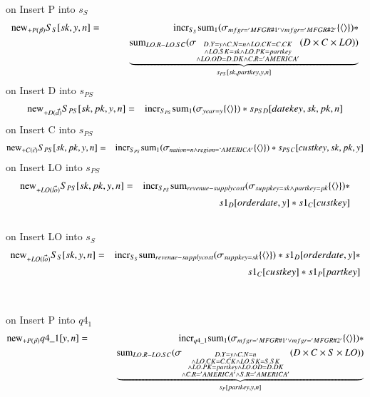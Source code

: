 on Insert P into $s_S$
\begin{eqnarray}
\mathrm{new}_{+P(\vec{p})} S_{S} [sk, y, n] &=& \mathrm{incr}_{S_{S}}
\mathrm{sum}_{1} (\sigma_{mfgr = 'MFGR\#1' \vee mfgr = 'MFGR\#2'} \{{\langle\rangle}\}) * 
\\\nonumber&&\qquad \underbrace{\mathrm{sum}_{LO.R - LO.SC} (\sigma_{\substack{ D.Y = y \wedge C.N = n \wedge LO.CK = C.CK \\\wedge LO.SK = sk \wedge LO.PK = partkey \\\wedge LO.OD = D.DK \wedge C.R = 'AMERICA' }} (D \times  C \times LO))}_{s_{PS}[sk, partkey, y, n]}
\end{eqnarray}
on Insert D into $s_{PS}$
\begin{eqnarray}
\mathrm{new}_{+D(\vec{d})} S_{PS} [sk, pk, y, n] &=& \mathrm{incr}_{S_{PS}}
\mathrm{sum}_{1} (\sigma_{year = y} \{{\langle\rangle}\} ) * s_{PSD} [datekey, sk, pk, n]
\end{eqnarray}
on Insert C into $s_{PS}$
\begin{eqnarray}
\mathrm{new}_{+C(\vec{c})} S_{PS} [sk, pk, y, n] &=& \mathrm{incr}_{S_{PS}}
\mathrm{sum}_{1} (\sigma_{nation = n \wedge region = `AMERICA'} \{{\langle\rangle}\} ) * s_{PSC}[custkey, sk, pk, y]
\end{eqnarray}
on Insert LO into $s_{PS}$
\begin{eqnarray}
\mathrm{new}_{+LO(\vec{lo})} S_{PS} [sk, pk, y, n] &=& \mathrm{incr}_{S_{PS}}
\mathrm{sum}_{revenue - supplycost} (\sigma_{suppkey = sk \wedge partkey = pk} \{{\langle\rangle}\} ) * 
\\\nonumber&&\qquad s1_{D}[orderdate, y] * s1_{C}[custkey]
\end{eqnarray}
\\
on Insert LO into $s_S$
\begin{eqnarray}
\mathrm{new}_{+LO(\vec{lo})} S_{S} [sk, y, n] &=& \mathrm{incr}_{S_{S}}
\mathrm{sum}_{revenue - supplycost} ( \sigma_{suppkey = sk} \{{\langle\rangle}\}) * s1_{D}[orderdate, y] *
\\\nonumber&&\qquad  s1_{C}[custkey] * s1_{P} [partkey]
\end{eqnarray}
\\\\
on Insert P into $q4_1$
\begin{eqnarray}
\mathrm{new}_{+P(\vec{p})} q4\_1[y,n] &=& 
\mathrm{incr}_{q4\_1} \mathrm{sum}_{1} (\sigma_{mfgr = 'MFGR\#1' \vee mfgr = 'MFGR\#2'} \{{\langle\rangle}\}) * \\
\nonumber&&\qquad \underbrace{\mathrm{sum}_{LO.R - LO.SC} (\sigma_{\substack{ D.Y = y \wedge C.N = n \\\wedge LO.CK = C.CK \wedge LO.SK = S.SK \\\wedge LO.PK = partkey \wedge LO.OD = D.DK \\\wedge C.R = 'AMERICA' \wedge S.R = 'AMERICA' }} (D \times  C \times S \times LO))}_{s_{P} [partkey, y, n]}
\end{eqnarray}
